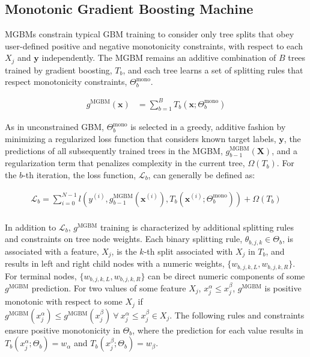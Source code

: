 \documentclass[information,article,submit,moreauthors,pdftex]{definitions/mdpi}
\begin{document}
\subsection{Monotonic Gradient Boosting Machine}\label{ssec:mgbm}

MGBMs constrain typical GBM training to consider only tree splits that obey user-defined positive and negative monotonicity constraints, with respect to each $X_j$ and $\mathbf{y}$ independently. The MGBM remains an additive combination of $B$ trees trained by gradient boosting, $T_b$, and each tree learns a set of splitting rules that respect monotonicity constraints,  $\Theta^\text{mono}_b$. 

\begin{equation}
\begin{aligned}\label{eq:rf}
g^{\text{MGBM}}(\mathbf{x}) &= \sum_{b=1}^B T_b\left(\mathbf{x}; \Theta^\text{mono}_b\right)
\end{aligned}
\end{equation}

\noindent As in unconstrained GBM, $\Theta^{\text{mono}}_b$ is selected in a greedy, additive fashion by minimizing a regularized loss function that considers known target labels, $\mathbf{y}$, the predictions of all subsequently trained trees in the MGBM, $g^{\text{MGBM}}_{b-1}(\mathbf{X})$, and a regularization term that penalizes complexity in the current tree, $\Omega(T_b)$. For the $b$-th iteration, the loss function, $\mathcal{L}_{b}$, can generally be defined as:

\begin{equation}
\begin{aligned}
\mathcal{L}_{b} =\sum_{i=0}^{N-1}l(y^{(i)}, g^{\text{MGBM}}_{b-1}(\mathbf{x}^{(i)}), T_b(\mathbf{x}^{(i)};\Theta^\text{mono}_b)) + \Omega(T_b)\\
\end{aligned}
\end{equation}

\noindent In addition to $\mathcal{L}_{b}$, $g^\text{MGBM}$ training is characterized by additional splitting rules and constraints on tree node weights. Each binary splitting rule, $\theta_{b,j,k} \in \Theta_b$, is associated with a feature, $X_j$, is the $k$-th split associated with $X_j$ in $T_b$, and results in left and right child nodes with a numeric weights, $\{w_{b,j,k,L}, w_{b,j,k,R}\}$. For terminal nodes, $\{w_{b,j,k,L}, w_{b,j,k,R}\}$ can be direct numeric components of some $g^\text{MGBM}$ prediction. For two values of some feature $X_j$, $x^{\alpha}_j \le x^{\beta}_j$, $g^{\text{MGBM}}$ is positive monotonic with respect to some $X_j$ if $g^{\text{MGBM}}(x^{\alpha}_j) \le g^{\text{MGBM}}(x^{\beta}_j) ~\forall ~x^{\alpha}_j \le x^{\beta}_j \in X_j$. The following rules and constraints ensure positive monotonicity in $\Theta_b$, where the prediction for each value results in $T_b(x^{\alpha}_j; \Theta_b) = w_\alpha$ and $T_b(x^{\beta}_j; \Theta_b) = w_\beta$.
\end{document}
